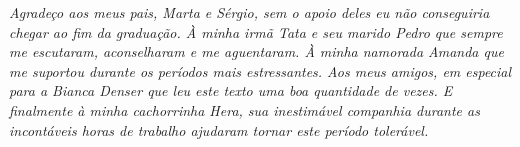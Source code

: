\emph{Agradeço aos meus pais, Marta e Sérgio, sem o apoio deles eu não conseguiria chegar ao fim da graduação.
À minha irmã Tata e seu marido Pedro que sempre me escutaram, aconselharam e me aguentaram.
À minha namorada Amanda que me suportou durante os períodos mais estressantes.
Aos meus amigos, em especial para a Bianca Denser que leu este texto uma boa quantidade de vezes.
E finalmente à minha cachorrinha Hera, sua inestimável companhia durante as incontáveis horas de trabalho
ajudaram tornar este período tolerável.}
